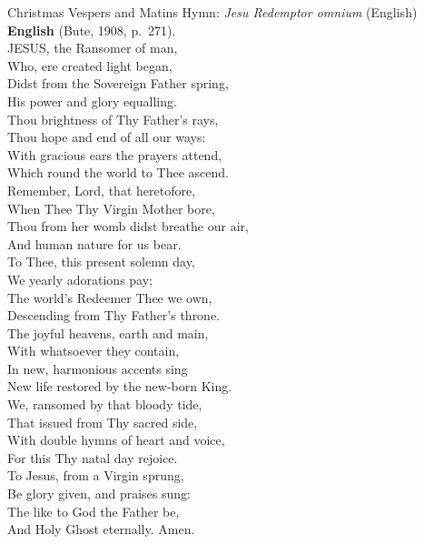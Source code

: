 \begin{massbox}{Christmas Vespers and Matins Hymn: \textit{Jesu Redemptor omnium} (English)}
\textbf{English} (Bute, 1908, p.~271).\\
JESUS, the Ransomer of man,\\
Who, ere created light began,\\
Didst from the Sovereign Father spring,\\
His power and glory equalling.\\[0.4em]
Thou brightness of Thy Father's rays,\\
Thou hope and end of all our ways:\\
With gracious ears the prayers attend,\\
Which round the world to Thee ascend.\\[0.4em]
Remember, Lord, that heretofore,\\
When Thee Thy Virgin Mother bore,\\
Thou from her womb didst breathe our air,\\
And human nature for us bear.\\[0.4em]
To Thee, this present solemn day,\\
We yearly adorations pay;\\
The world's Redeemer Thee we own,\\
Descending from Thy Father's throne.\\[0.4em]
The joyful heavens, earth and main,\\
With whatsoever they contain,\\
In new, harmonious accents sing\\
New life restored by the new-born King.\\[0.4em]
We, ransomed by that bloody tide,\\
That issued from Thy sacred side,\\
With double hymns of heart and voice,\\
For this Thy natal day rejoice.\\[0.4em]
To Jesus, from a Virgin sprung,\\
Be glory given, and praises sung:\\
The like to God the Father be,\\
And Holy Ghost eternally. Amen.
\end{massbox}

